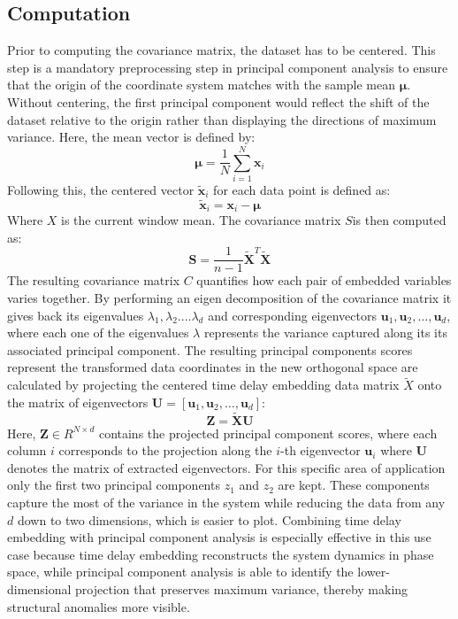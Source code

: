 \subsection{Computation}
Prior to computing the covariance matrix, the dataset has to be centered. This step is a mandatory preprocessing step in principal component analysis to ensure that the origin of the coordinate system matches with the sample mean $\boldsymbol{\mu}$. Without centering, the first principal component would reflect the shift of the dataset relative to the origin rather than displaying the directions of maximum variance. Here, the mean vector is defined by:
\begin{equation}
\boldsymbol{\mu} = \frac{1}{N} \sum_{i=1}^{N} \mathbf{x}_i
\label{eq:mean_vector}
\end{equation}
Following this, the centered vector $\tilde{\mathbf{x}}_i$ for each data point is defined as:
\begin{equation}
\tilde{\mathbf{x}}_i = \mathbf{x}_i - \boldsymbol{\mu}
\label{eq:centering_vector}
\end{equation}
Where $X$ is the current window mean. 
The covariance matrix $S$is then computed as:
\begin{equation}
\mathbf{S} = \frac{1}{n-1} \tilde{\mathbf{X}}^T \tilde{\mathbf{X}}
\end{equation}
The resulting covariance matrix $C$ quantifies how each pair of embedded variables varies together. By performing an eigen decomposition of the covariance matrix it gives back its eigenvalues $\lambda_1 ,\lambda_2....\lambda_d$ and corresponding eigenvectors $\mathbf{u}_1, \mathbf{u}_2, \dots, \mathbf{u}_d$, where each one of the eigenvalues $\lambda$ represents the variance captured along its its associated principal component\parencite[p.~382]{rencher2002methods}.
The resulting principal components scores represent the transformed data coordinates in the new orthogonal space are calculated by projecting the centered time delay embedding data matrix $\tilde{X}$ onto the matrix of eigenvectors $\mathbf{U} = [\mathbf{u}_1, \mathbf{u}_2, \dots, \mathbf{u}_d]$:
\begin{equation}
\mathbf{Z} = \tilde{\mathbf{X}}\mathbf{U}
\label{eq:pca_scores}
\end{equation}
Here, $\mathbf{Z} \in {R}^{N \times d}$ contains the projected principal component scores, where each column $i$ corresponds to the projection along the $i$-th eigenvector $\mathbf{u}_i$ where $\mathbf{U}$ denotes the matrix of extracted eigenvectors. For this specific area of application only the first two principal components $z_1$ and $z_2$ are kept. These components capture the most of the variance in the system while reducing the data from any $d$ down to two dimensions, which is easier to plot. Combining time delay embedding  with principal component analysis is especially effective in this use case because time delay embedding reconstructs the system dynamics in phase space, while principal component analysis is able to identify the lower-dimensional projection that preserves maximum variance, thereby making structural anomalies more visible. 
